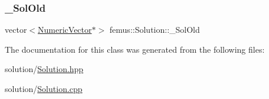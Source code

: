 \subsubsection{\texorpdfstring{\+\_\+\+Sol\+Old}{\_SolOld}}
{\footnotesize\ttfamily vector$<$\mbox{\hyperlink{classfemus_1_1_numeric_vector}{Numeric\+Vector}}$\ast$$>$ femus\+::\+Solution\+::\+\_\+\+Sol\+Old}



The documentation for this class was generated from the following files\+:\begin{DoxyCompactItemize}
\item 
solution/\mbox{\hyperlink{_solution_8hpp}{Solution.\+hpp}}\item 
solution/\mbox{\hyperlink{_solution_8cpp}{Solution.\+cpp}}\end{DoxyCompactItemize}
